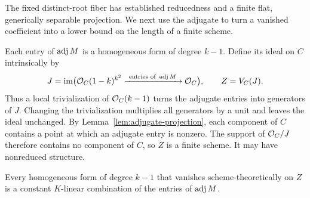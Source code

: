 The fixed distinct-root fiber has established reducedness and a finite
flat, generically separable projection.  We next use the adjugate to turn a vanished
coefficient into a lower bound on the length of a finite scheme.

Each entry of \(\operatorname{adj} M\) is a homogeneous form of degree \(k-1\).
Define its ideal on \(C\) intrinsically by
\begin{equation}
 \label{eq:adjugate-ideal}
 J=\operatorname{im}\bigl(\mathcal O_C(1-k)^{k^2}
                  \xrightarrow{\ \text{entries of }\operatorname{adj} M\ }\mathcal O_C\bigr),
 \qquad Z=V_C(J).
\end{equation}
Thus a local trivialization of \(\mathcal O_C(k-1)\) turns the adjugate
entries into generators of \(J\).  Changing the trivialization
multiplies all generators by a unit and leaves the ideal unchanged.
By Lemma~\ref{lem:adjugate-projection}, each component of \(C\)
contains a point at which an adjugate entry is nonzero.  The support
of \(\mathcal O_C/J\) therefore contains no component of \(C\), so \(Z\)
is a finite scheme.  It may have nonreduced structure.

\begin{lemma}
 \label{lem:adjugate-generation}
Every homogeneous form of degree \(k-1\) that vanishes
scheme-theoretically on \(Z\) is a constant \(K\)-linear combination
of the entries of \(\operatorname{adj} M\).
\end{lemma}

